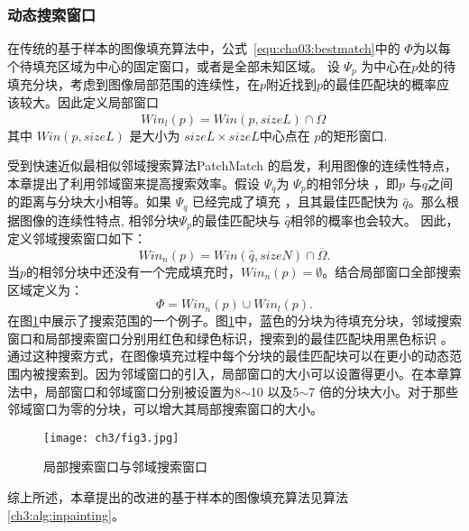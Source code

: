  \subsubsection{动态搜索窗口}
 \label{sec:subsub:dynamicSearch}
 在传统的基于样本的图像填充算法中，公式~\ref{equ:cha03:bestmatch}中的 \(\Phi\)为以每个待填充区域为中心的固定窗口\cite{LeMeur_2011}，或者是全部未知区域\cite{Criminisi04regionfilling}。 设 \(\Psi_p\) 为中心在\(p\)处的待填充分块，考虑到图像局部范围的连续性，在\(p\)附近找到\(p\)的最佳匹配块的概率应该较大。因此定义局部窗口
 $$Win_l(p)=Win(p,sizeL)\cap \overline{\Omega}\,$$
 其中 \(Win(p,sizeL)\) 是大小为 \(sizeL\times sizeL\)中心点在 \( p\)的矩形窗口. \par
受到快速近似最相似邻域搜索算法PatchMatch \cite{Barnes:2009}的启发，利用图像的连续性特点，本章提出了利用邻域窗来提高搜索效率。假设 \(\Psi_q\)为 \(\Psi_p\)的相邻分块 ，即\(p\) 与\(q\)之间的距离与分块大小相等。如果 \(\Psi_q\) 已经完成了填充 ，且其最佳匹配快为 \(\hat{q}\)。那么根据图像的连续性特点,  相邻分块\(\Psi_p\)的最佳匹配块与 \(\hat{q}\)相邻的概率也会较大。 因此，定义邻域搜索窗口如下：
 $$Win_n(p)=Win(\hat{q},sizeN)\cap\overline{\Omega}.$$
 当\(p\)的相邻分块中还没有一个完成填充时，\( Win_n(p)=\emptyset  \)。结合局部窗口全部搜索区域定义为：
 $$\Phi=Win_n(p)\cup Win_l(p).$$
 在图\ref{ch3:fig:3}中展示了搜索范围的一个例子。图\ref{ch3:fig:3}中，蓝色的分块为待填充分块，邻域搜索窗口和局部搜索窗口分别用红色和绿色标识，搜索到的最佳匹配块用黑色标识 。通过这种搜索方式，在图像填充过程中每个分块的最佳匹配块可以在更小的动态范围内被搜索到。因为邻域窗口的引入，局部窗口的大小可以设置得更小。在本章算法中，局部窗口和邻域窗口分别被设置为8\(\sim\)10 以及5\(\sim\)7 倍的分块大小。对于那些邻域窗口为零的分块，可以增大其局部搜索窗口的大小。\par
 \begin{figure}[!htbp]
 	\begin{center}
 			\texttt{[image: ch3/fig3.jpg]}
 	\end{center}
     \caption{局部搜索窗口与邻域搜索窗口}
 	\label{ch3:fig:3}
 \end{figure}
 综上所述，本章提出的改进的基于样本的图像填充算法见算法\ref{ch3:alg:inpainting}。
 \renewcommand{\algorithmcfname}{算法}
